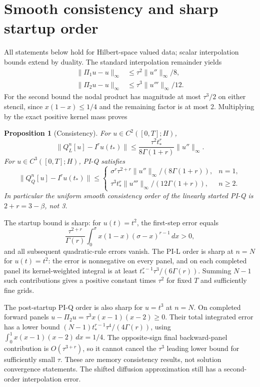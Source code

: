 \documentclass[11pt,a4paper]{article}
\newtheorem{proposition}{Proposition}
\newcommand{\norm}[1]{\lVert#1\rVert}
\begin{document}
\section{Smooth consistency and sharp startup order}
All statements below hold for Hilbert-space valued data; scalar interpolation bounds extend by duality. The standard interpolation remainder yields
\begin{align*}
 \norm{\Pi_1u-u}_{\infty}&\le \tau^2\norm{u''}_{\infty}/8,\\
 \norm{\Pi_2u-u}_{\infty}&\le \tau^3\norm{u'''}_{\infty}/12.
\end{align*}
For the second bound the nodal product has magnitude at most $\tau^3/2$ on either stencil, since $x(1-x)\le1/4$ and the remaining factor is at most 2. Multiplying by the exact positive kernel mass proves
\begin{proposition}[Consistency]
For $u\in C^2([0,T];H)$,
\[
 \norm{Q_L^n[u]-I^ru(t_*)}\le\frac{\tau^2 t_*^r}{8\Gamma(1+r)}\norm{u''}_{\infty}.
\]
For $u\in C^3([0,T];H)$, PI-Q satisfies
\[
 \norm{Q_Q^n[u]-I^ru(t_*)}\le
 \begin{cases}
 \sigma^r\tau^{2+r}\norm{u''}_{\infty}/(8\Gamma(1+r)),&n=1,\\
 \tau^3t_*^r\norm{u'''}_{\infty}/(12\Gamma(1+r)),&n\ge2.
 \end{cases}
\]
In particular the uniform smooth consistency order of the linearly started PI-Q is $2+r=3-\beta$, not 3.
\end{proposition}
The startup bound is sharp: for $u(t)=t^2$, the first-step error equals
\[
 \frac{\tau^{2+r}}{\Gamma(r)}\int_0^\sigma x(1-x)(\sigma-x)^{r-1}\,dx>0,
\]
and all subsequent quadratic-rule errors vanish. The PI-L order is sharp at $n=N$ for $u(t)=t^2$: the error is nonnegative on every panel, and on each completed panel its kernel-weighted integral is at least $t_*^{r-1}\tau^3/(6\Gamma(r))$. Summing $N-1$ such contributions gives a positive constant times $\tau^2$ for fixed $T$ and sufficiently fine grids.

The post-startup PI-Q order is also sharp for $u=t^3$ at $n=N$. On completed forward panels $u-\Pi_2u=\tau^3 x(x-1)(x-2)\ge0$. Their total integrated error has a lower bound $(N-1)t_*^{r-1}\tau^4/(4\Gamma(r))$, using $\int_0^1 x(x-1)(x-2)\,dx=1/4$. The opposite-sign final backward-panel contribution is $O(\tau^{3+r})$, so it cannot cancel the $\tau^3$ leading lower bound for sufficiently small $\tau$. These are memory consistency results, not solution convergence statements. The shifted diffusion approximation still has a second-order interpolation error.
\end{document}
